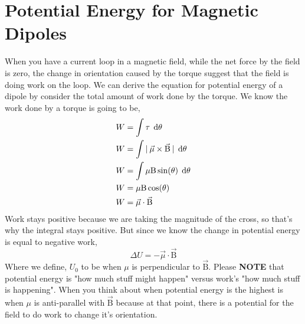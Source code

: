 \section{Potential Energy for Magnetic Dipoles}
When you have a current loop in a magnetic field, while the net force by the field is zero, the change in orientation caused by the torque suggest that the field is doing work on the loop. We can derive the equation for potential energy of a dipole by consider the total amount of work done by the torque. We know the work done by a torque is going to be,
\begin{align*}
	W &= \int \tau \:\:\mathrm{\mathrm{d}\theta} \\ 
	W &= \int | \: \vec{\mu} \times \vec{\mathrm{B}} \: | \:\:\mathrm{\mathrm{d}\theta}  \\ 
	W &= \int \mu\mathrm{B}\sin(\theta) \:\:\mathrm{\mathrm{d}\theta}  \\ 
	W &= \mu \mathrm{B}\cos(\theta)\\  
	W &= \vec{\mu} \cdot \vec{\mathrm{B}}
\end{align*}
Work stays positive because we are taking the magnitude of the cross, so that's why the integral stays positive. But since we know the change in potential energy is equal to negative work, 
\begin{equation*}
	\Delta U = -\vec{\mu} \cdot \vec{\mathrm{B}}
\end{equation*}
Where we define, $U_0$ to be when $\mu$ is perpendicular to $\vec{\mathrm{B}}$. Please \textbf{NOTE} that potential energy is "how much stuff might happen" versus work's "how much stuff is happening". When you think about when potential energy is the highest is when $\mu$ is anti-parallel with $\vec{\mathrm{B}}$ because at that point, there is a potential for the field to do work to change it's orientation. 
